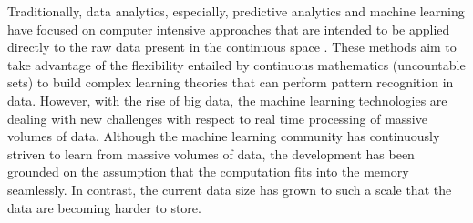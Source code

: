 
Traditionally, data analytics, especially, predictive analytics and machine learning have focused on computer intensive approaches that are intended to be applied directly to the raw data present in the continuous space \citep{bishop2006pattern}. These methods aim to take advantage of the flexibility entailed by continuous mathematics (uncountable sets) to build complex learning theories that can perform pattern recognition in data. However, with the rise of big data, the machine learning technologies are dealing with new challenges with respect to real time processing of massive volumes of data. Although the machine learning community has continuously striven to learn from massive volumes of data, the development has been grounded on the assumption that the computation fits into the memory seamlessly. In contrast, the current data size has grown to such a scale that the data are becoming harder to store. 


